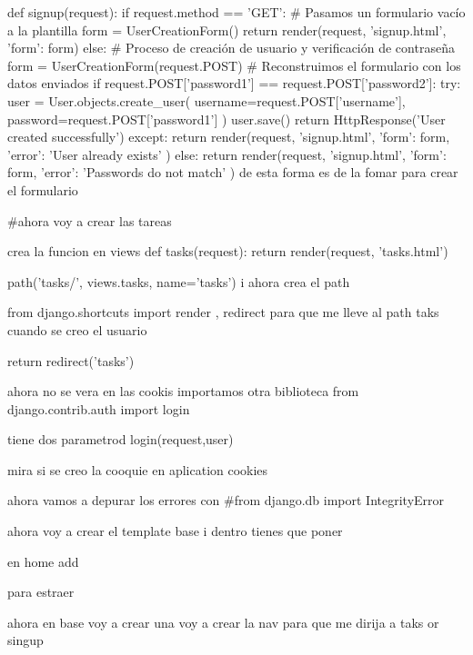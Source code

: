 {{def signup(request):
    if request.method == 'GET':
        # Pasamos un formulario vacío a la plantilla
        form = UserCreationForm()
        return render(request, 'signup.html', {'form': form})
    else:
        # Proceso de creación de usuario y verificación de contraseña
        form = UserCreationForm(request.POST)  # Reconstruimos el formulario con los datos enviados
        if request.POST['password1'] == request.POST['password2']:
            try:
                user = User.objects.create_user(
                    username=request.POST['username'],
                    password=request.POST['password1']
                )
                user.save()
                return HttpResponse('User created successfully')
            except:
                return render(request, 'signup.html', {
                    'form': form,
                    'error': 'User already exists'
                })
        else:
            return render(request, 'signup.html', {
                'form': form,
                'error': 'Passwords do not match'
            })
 de esta forma es de la fomar para crear el formulario

 #ahora voy a crear las tareas

 crea la funcion en views 
 def tasks(request):
    return render(request, 'tasks.html')

    path('tasks/', views.tasks, name='tasks') i ahora crea el path

    from django.shortcuts import render , redirect para que me lleve al path taks cuando se creo el usuario

    return redirect('tasks')

    ahora no se vera en las cookis importamos otra biblioteca 
    from django.contrib.auth import login

    tiene dos parametrod login(request,user)

    mira si se creo la cooquie en aplication cookies

    ahora vamos a depurar los errores con 
#from django.db import IntegrityError

ahora voy a crear el template base 
i dentro tienes que poner 

    {%
    {%

    en home add {%
 para estraer 

 ahora en base voy a crear una  voy a crear la nav para que me dirija a taks or singup

 {%


}}}}}}
